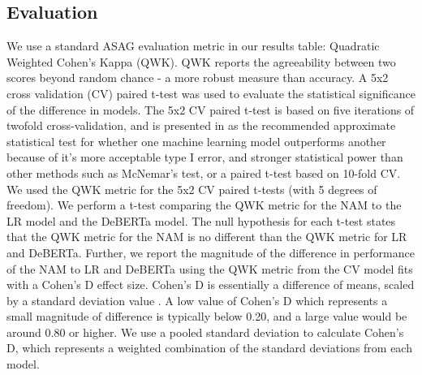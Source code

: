 \subsection{Evaluation}
We use a standard ASAG evaluation metric in our results table: Quadratic Weighted Cohen’s Kappa (QWK). QWK reports the agreeability between two scores beyond random chance - a more robust measure than accuracy. A 5x2 cross validation (CV) paired t-test was used to evaluate the statistical significance of the difference in models. The 5x2 CV paired t-test is based on five iterations of twofold cross-validation, and is presented in \cite{dietterich_1998} as the recommended approximate statistical test for whether one machine learning model outperforms another because of it’s more acceptable type I error, and stronger statistical power than other methods such as McNemar’s test, or a paired t-test based on 10-fold CV. We used the QWK metric for the 5x2 CV paired t-tests (with 5 degrees of freedom). We perform a t-test comparing the QWK metric for the NAM to the LR model and the DeBERTa model. The null hypothesis for each t-test states that the QWK metric for the NAM is no different than the QWK metric for LR and DeBERTa. Further, we report the magnitude of the difference in performance of the NAM to LR and DeBERTa using the QWK metric from the CV model fits with a Cohen's D effect size. Cohen's D is essentially a difference of means, scaled by a standard deviation value \cite{kelley2012effect}. A low value of Cohen's D which represents a small magnitude of difference is typically below 0.20, and a large value would be around 0.80 or higher. We use a pooled standard deviation to calculate Cohen's D, which represents a weighted combination of the standard deviations from each model. 

